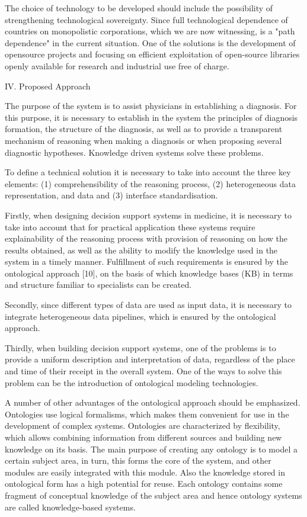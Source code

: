 \documentclass[twocolumn]{scndocument}
\begin{document}
The choice of technology to be developed should
include the possibility of strengthening technological
sovereignty. Since full technological dependence of countries on monopolistic corporations, which we are now
witnessing, is a "path dependence" in the current situation. One of the solutions is the development of opensource projects and focusing on efficient exploitation of
open-source libraries openly available for research and
industrial use free of charge.

\begin{center}
\vspace{-3pt}
IV. Proposed Approach
\vspace{-3pt}
\end{center}

The purpose of the system is to assist physicians in
establishing a diagnosis. For this purpose, it is necessary
to establish in the system the principles of diagnosis
formation, the structure of the diagnosis, as well as
to provide a transparent mechanism of reasoning when
making a diagnosis or when proposing several diagnostic
hypotheses. Knowledge driven systems solve these problems.

To define a technical solution it is necessary to take
into account the three key elements: (1) comprehensibility of the reasoning process, (2) heterogeneous data
representation, and data and (3) interface standardisation.

Firstly, when designing decision support systems in
medicine, it is necessary to take into account that for
practical application these systems require explainability of the reasoning process with provision of reasoning
on how the results obtained, as well as the ability to
modify the knowledge used in the system in a timely
manner. Fulfillment of such requirements is ensured by
the ontological approach [10], on the basis of which
knowledge bases (KB) in terms and structure familiar
to specialists can be created.

Secondly, since different types of data are used as
input data, it is necessary to integrate heterogeneous data
pipelines, which is ensured by the ontological approach.

Thirdly, when building decision support systems, one
of the problems is to provide a uniform description and
interpretation of data, regardless of the place and time
of their receipt in the overall system. One of the ways to
solve this problem can be the introduction of ontological
modeling technologies.

A number of other advantages of the ontological
approach should be emphasized. Ontologies use logical
formalisms, which makes them convenient for use in the
development of complex systems. Ontologies are characterized by flexibility, which allows combining information from different sources and building new knowledge
on its basis. The main purpose of creating any ontology
is to model a certain subject area, in turn, this forms
the core of the system, and other modules are easily
integrated with this module. Also the knowledge stored
in ontological form has a high potential for reuse. Each
ontology contains some fragment of conceptual knowledge of the subject area and hence ontology systems are
called knowledge-based systems.
\end{document}
